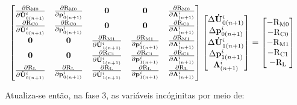 \begin{align}
	\begin{bmatrix}
		\frac{\partial\mathrm{R}_\mathrm{M0}}{\partial\mathbf{\dot{U}}_{0(n+1)}^{i}} & \frac{\partial\mathrm{R}_\mathrm{M0}}{\partial\mathbf{p}_{0(n+1)}^{i}} & \mathbf{0} & \mathbf{0} & \frac{\partial\mathrm{R}_\mathrm{M0}}{\partial\boldsymbol{\Lambda}_{(n+1)}^{i}} \\
		\frac{\partial\mathrm{R}_\mathrm{C0}}{\partial\mathbf{\dot{U}}_{0(n+1)}^{i}} & \frac{\partial\mathrm{R}_\mathrm{C0}}{\partial\mathbf{p}_{0(n+1)}^{i}} & \mathbf{0} & \mathbf{0} & \frac{\partial\mathrm{R}_\mathrm{C0}}{\partial\boldsymbol{\Lambda}_{(n+1)}^{i}} \\
		 \mathbf{0} & \mathbf{0} & \frac{\partial\mathrm{R}_\mathrm{M1}}{\partial\mathbf{\dot{U}}_{1(n+1)}^{i}} & \frac{\partial\mathrm{R}_\mathrm{M1}}{\partial\mathbf{p}_{1(n+1)}^{i}} & \frac{\partial\mathrm{R}_\mathrm{M1}}{\partial\boldsymbol{\Lambda}_{(n+1)}^{i}} \\
		 \mathbf{0} & \mathbf{0} & \frac{\partial\mathrm{R}_\mathrm{C1}}{\partial\mathbf{\dot{U}}_{1(n+1)}^{i}} & \frac{\partial\mathrm{R}_\mathrm{C1}}{\partial\mathbf{p}_{1(n+1)}^{i}} & \frac{\partial\mathrm{R}_\mathrm{C1}}{\partial\boldsymbol{\Lambda}_{(n+1)}^{i}} \\
		  \frac{\partial\mathrm{R}_\mathrm{L}}{\partial\mathbf{\dot{U}}_{0(n+1)}^{i}} & \frac{\partial\mathrm{R}_\mathrm{L}}{\partial\mathbf{p}_{0(n+1)}^{i}} & \frac{\partial\mathrm{R}_\mathrm{L}}{\partial\mathbf{\dot{U}}_{1(n+1)}^{i}} & \frac{\partial\mathrm{R}_\mathrm{L}}{\partial\mathbf{p}_{1(n+1)}^{i}} & \frac{\partial\mathrm{R}_\mathrm{L}}{\partial\boldsymbol{\Lambda}_{(n+1)}^{i}}
	\end{bmatrix}
	\begin{bmatrix}
		\Delta\mathbf{\dot{U}}_{0(n+1)}^{i} \\
		\Delta\mathbf{p}_{0(n+1)}^{i} \\
		\Delta\mathbf{\dot{U}}_{1(n+1)}^{i} \\
		\Delta\mathbf{p}_{1(n+1)}^{i} \\
		\boldsymbol{\Lambda}_{(n+1)}^{i}
	\end{bmatrix}
	&=
	\begin{bmatrix}
		-\mathrm{R}_\mathrm{M0} \\
		-\mathrm{R}_\mathrm{C0} \\
		-\mathrm{R}_\mathrm{M1} \\
		-\mathrm{R}_\mathrm{C1} \\
		-\mathrm{R}_\mathrm{L}
	\end{bmatrix}
	\label{eq:sistema_linear_Arlq}
\end{align}	

Atualiza-se então, na fase 3, as variáveis incóginitas por meio de:

